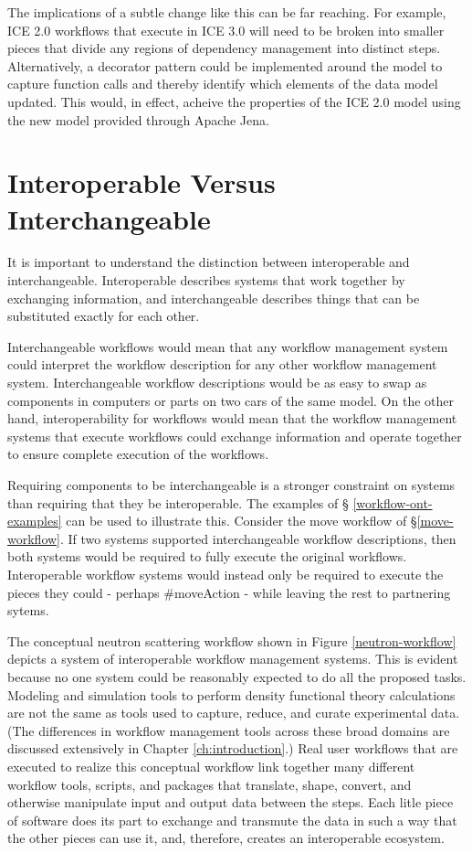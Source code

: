 The implications of a subtle change like this can be far reaching. For example,
ICE 2.0 workflows that execute in ICE 3.0 will need to be broken into smaller
pieces that divide any regions of dependency management into distinct steps.
Alternatively, a decorator pattern could be implemented around the model to
capture function calls and thereby identify which elements of the data model
updated. This would, in effect, acheive the properties of the ICE 2.0 model
using the new model provided through Apache Jena.

\section{Interoperable Versus Interchangeable}

It is important to understand the distinction between interoperable and
interchangeable. Interoperable describes systems that work together by
exchanging information, and interchangeable describes things that can be
substituted exactly for each other.

Interchangeable workflows would mean that any workflow management system could
interpret the workflow description for any other workflow management system.
Interchangeable workflow descriptions would be as easy to swap as components in
computers or parts on two cars of the same model. On the other hand,
interoperability for workflows would mean that the workflow management systems
that execute workflows could exchange information and operate together to
ensure complete execution of the workflows.

Requiring components to be interchangeable is a stronger constraint on systems
than requiring that they be interoperable. The examples of \S
\ref{workflow-ont-examples} can be used to illustrate this. Consider the move
workflow of \S \ref{move-workflow}. If two systems supported interchangeable
workflow descriptions, then both systems would be required to fully execute the
original workflows. Interoperable workflow systems would instead only be
required to execute the pieces they could - perhaps \#moveAction - while leaving
the rest to partnering sytems.

The conceptual neutron scattering workflow shown in Figure
\ref{neutron-workflow} depicts a system of interoperable workflow management
systems. This is evident because no one system could be reasonably expected to
do all the proposed tasks. Modeling and simulation tools to perform density
functional theory calculations are not the same as tools used to capture,
reduce, and curate experimental data. (The differences in workflow management tools
across these broad domains are discussed extensively in Chapter
\ref{ch:introduction}.) Real user workflows that are executed to realize this
conceptual workflow link together many different workflow tools, scripts, and
packages that translate, shape, convert, and otherwise manipulate input and
output data between the steps. Each litle piece of software does its part to
exchange and transmute the data in such a way that the other pieces can use it,
and, therefore, creates an interoperable ecosystem.

